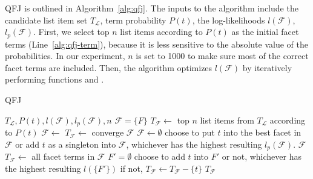 QFJ is outlined in Algorithm~\ref{alg:qfj}. The inputs to the algorithm include the candidate list item set $T_{\mathcal{L}}$, term probability $P(t)$, the log-likelihoods $l(\mathcal{F})$, $l_p(\mathcal{F})$.
First, we select top $n$ list items according to $P(t)$ as the initial facet terms (Line~\ref{alg:qfj-term}), because it is less sensitive to the absolute value of the probabilities.
In our experiment, $n$ is set to 1000 to make sure most of the correct facet terms are included.
Then, the algorithm optimizes $l(\mathcal{F})$ by iteratively performing functions  and .

\begin{algorithm}[!ht]
 \caption{QFJ}
\label{alg:qfj}
\begin{algorithmic}[1]
  \Require $T_{\mathcal{L}}, P(t), l(\mathcal{F}), l_p(\mathcal{F}), n$
  \Ensure $\mathcal{F}=\{F\}$
  \State $T_\mathcal{F} \leftarrow$ top $n$ list items from $T_{\mathcal{L}}$ according to $P(t)$ \label{alg:qfj-term}
  \Repeat
  \State $\mathcal{F}\leftarrow$ 
  \State $T_\mathcal{F}\leftarrow$ 
  \Until converge
  \State \Return $\mathcal{F}$
  \State
    \State $\mathcal{F} \leftarrow \emptyset$ 
     \label{alg:cluster-b}
      \State choose to put $t$ into the best facet in $\mathcal{F}$ 
      \State or add $t$ as a singleton into $\mathcal{F}$, 
      \State whichever has the highest resulting $l_p(\mathcal{F})$.
    \EndFor \label{alg:cluster-e}
  \State \Return $\mathcal{F}$
  \EndFunction 
  \State
{}
  \State $T_\mathcal{F}\leftarrow$ all facet terms in $\mathcal{F}$
    \State $F'=\emptyset$
     \label{alg:qfj-check}
      \State choose to add $t$ into $F'$ or not,
      \State whichever has the highest resulting $l(\{F'\})$
      \State if not, $T_\mathcal{F}\leftarrow T_\mathcal{F} - \{t\}$ \label{alg:qfj-remove}
    \EndFor
  \EndFor
  \State \Return  $T_\mathcal{F}$ \label{alg:qfj-return}
\EndFunction 
\end{algorithmic}
\end{algorithm}

